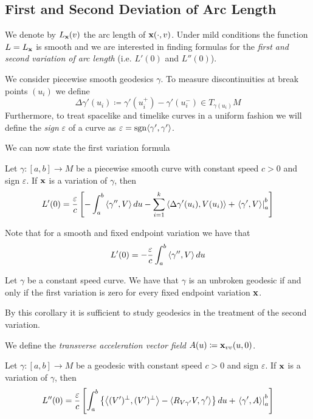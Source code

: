 \subsection{First and Second Deviation of Arc Length}
We denote by $L_{\mathbf{x}}(v)$ the arc length of $\mathbf{x}(\cdot,v)$. Under mild conditions the function $L=L_{\mathbf{x}}$ is smooth and we are interested in finding formulas for the \emph{first and second variation of arc length} (i.e. $L'(0)$ and $L''(0)$).

We consider piecewise smooth geodesics $\gamma$. To measure discontinuities at break points $(u_i)$ we define 
\[
\Delta\gamma'(u_i)\coloneqq\gamma'(u_i^+)-\gamma'(u_i^-)\in T_{\gamma(u_i)}M
\]
Furthermore, to treat spacelike and timelike curves in a uniform fashion we will define the \emph{sign} $\varepsilon$ of a curve as $\varepsilon=\operatorname{sgn}\langle\gamma',\gamma'\rangle$.

We can now state the first variation formula
\begin{proposition}Let $\gamma:[a,b]\to M$ be a piecewise  smooth curve with constant speed $c>0$ and sign $\varepsilon$. If $\mathbf{x}$ is a variation of $\gamma$, then
\[
L'(0) = \frac{\varepsilon}{c}\left[-\int_a^b\left\langle \gamma'',V \right\rangle du
-\sum_{i=1}^k\left\langle \Delta\gamma'(u_i),V(u_i) \right\rangle + \left.\left\langle \gamma',V \right\rangle\right\rvert_a^b\right]
\]
\end{proposition}
Note that for a smooth and fixed endpoint variation we have that
\[
L'(0) = -\frac{\varepsilon}{c}\int_a^b\left\langle \gamma'',V \right\rangle du
\]

\begin{corollary}\label{cor:geoismax}
Let $\gamma$ be a constant speed curve. We have that $\gamma$ is an unbroken geodesic if and only if the first variation is zero for every fixed endpoint variation $\mathbf{x}$.
\end{corollary}

By this corollary it is sufficient to study geodesics in the treatment of the second variation.

We define the \emph{transverse acceleration vector field} $A(u)\coloneqq\mathbf{x}_{vv}(u,0)$.

\begin{proposition}Let $\gamma:[a,b]\to M$ be a geodesic with constant speed $c>0$ and sign $\varepsilon$. If $\mathbf{x}$ is a variation of $\gamma$, then
\[
L''(0) = \frac{\varepsilon}{c}\left[
\int_a^b\left\{ \left\langle (V')^\perp,(V')^\perp \right\rangle
-\left\langle R_{V\gamma'}V,\gamma' \right\rangle\right\} du
+\left.\left\langle \gamma',A \right\rangle\right\rvert_a^b\right]
\]
\end{proposition}

